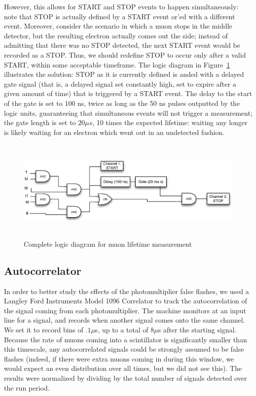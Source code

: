 However, this allows for START and STOP events to happen simultaneously: note that STOP is actually defined by a START event or'ed with a different event. Moreover, consider the scenario in which a muon stops in the middle detector, but the resulting electron actually comes out the side; instead of admitting that there was no STOP detected, the next START event would be recorded as a STOP. Thus, we should redefine STOP to occur only after a valid START, within some acceptable timeframe. The logic diagram in Figure~\ref{figure:logic} illustrates the solution: STOP as it is currently defined is anded with a delayed gate signal (that is, a delayed signal set constantly high, set to expire after a given amount of time) that is triggered by a START event. The delay to the start of the gate is set to 100 ns, twice as long as the 50 ns pulses outputted by the logic units, guaranteeing that simultaneous events will not trigger a measurement; the gate length is set to $20 \mu s$, 10 times the expected lifetime: waiting any longer is likely waiting for an electron which went out in an undetected fashion.

\begin{figure}[htbp]
\begin{center}
\includegraphics[height=50mm]{./figures/logicdiagram.eps}
\caption{Complete logic diagram for muon lifetime measurement}
\label{figure:logic}
\end{center}
\end{figure}


\subsection{Autocorrelator}
\label{autocorrelator}
In order to better study the effects of the photomultiplier false flashes, we used a Langley Ford Instruments Model 1096 Correlator to track the autocorrelation of the signal coming from each photomultiplier. The machine monitors at an input line for a signal, and records when another signal comes onto the same channel. We set it to record bins of $.1 \mu$s, up to a total of $8 \mu$s after the starting signal. Because the rate of muons coming into a scintillator is significantly smaller than this timescale, any autocorrelated signals could be strongly assumed to be false flashes (indeed, if there were extra muons coming in during this window, we would expect an even distribution over all times, but we did not see this). The results were normalized by dividing by the total number of signals detected over the run period.

